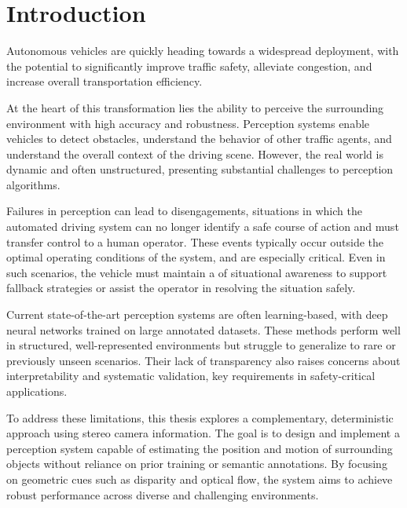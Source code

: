
\chapter{Introduction}\label{chap:Introduction}

Autonomous vehicles are quickly heading towards a widespread deployment, with 
the potential to significantly improve traffic safety, alleviate congestion, 
and increase overall transportation efficiency. 

At the heart of this transformation lies the ability to perceive the surrounding environment with 
high accuracy and robustness. Perception systems enable vehicles to detect 
obstacles, understand the behavior of other traffic agents, and understand 
the overall context of the driving scene. However, the real world is dynamic and 
often unstructured, presenting substantial challenges to perception algorithms.

Failures in perception can lead to disengagements, situations in which the 
automated driving system can no longer identify a safe course of action and 
must transfer control to a human operator. These events 
typically occur outside the optimal operating conditions of the system, and are 
especially critical. Even in such scenarios, the vehicle must maintain a  
of situational awareness to support fallback strategies or assist the operator 
in resolving the situation safely.

Current state-of-the-art perception systems are often learning-based, 
with deep neural networks trained on large annotated datasets. These methods 
perform well in structured, well-represented environments but struggle to 
generalize to rare or previously unseen scenarios. Their lack of transparency 
also raises concerns about interpretability and systematic validation, key 
requirements in safety-critical applications.

To address these limitations, this thesis explores a complementary, deterministic 
approach using stereo camera information. The goal is to design and implement a 
perception system capable of estimating the position and motion of surrounding 
objects without reliance on prior training or semantic annotations. By focusing 
on geometric cues such as disparity and optical flow, the system aims to achieve 
robust performance across diverse and challenging environments.

